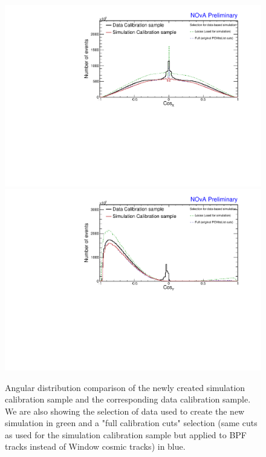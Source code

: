 \begin{figure}[!ht]
\includegraphics[width=\textwidth]{Plots/TBCalibration/DBSim_DataMCComparison_CosX.pdf}
\includegraphics[width=\textwidth]{Plots/TBCalibration/DBSim_DataMCComparison_CosY.pdf}
\caption[Data-Simulation comparison of angular distributions]{Angular distribution comparison of the newly created simulation calibration sample and the corresponding data calibration sample. We are also showing the selection of data used to create the new simulation in green and a "full calibration cuts" selection (same cuts as used for the simulation calibration sample but applied to \acrshort{BPF} tracks instead of Window cosmic tracks) in blue.}
\label{fig:DataBasedSimDataMCComparison_cosXcosY}
\end{figure}


